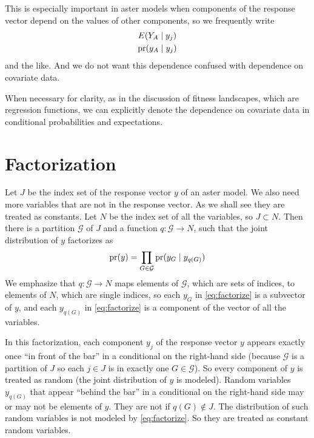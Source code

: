 This is especially important in aster models when components of the response
vector depend on the values of other components, so we frequently write
\begin{gather*}
   E(Y_A \mid y_j)
   \\
   \operatorname{pr}(y_A \mid y_j)
\end{gather*}
and the like.  And we do not want this dependence confused with dependence
on covariate data.

When necessary for clarity, as in the discussion of fitness landscapes,
which are regression functions,
we can explicitly denote the dependence on covariate data in conditional
probabilities and expectations.

\section{Factorization}
\label{sec:factorization}

Let $J$ be the index set of the response vector $y$ of an aster model.
We also need more variables that are not in the response vector.
As we shall see they are treated as constants.
Let $N$ be the index set of all the variables, so $J \subset N$.
Then there is a partition $\mathcal{G}$ of $J$
and a function $q : \mathcal{G} \to N$, such that
the joint distribution of $y$ factorizes as
\begin{equation} \label{eq:factorize}
   \operatorname{pr}(y) = \prod_{G \in \mathcal{G}} \operatorname{pr}(y_G \mid y_{q(G)})
\end{equation}
We emphasize that $q : \mathcal{G} \to N$ maps elements of $\mathcal{G}$,
which are sets of indices, to elements of $N$, which are single indices,
so each $y_G$ in \eqref{eq:factorize} is a subvector of $y$,
and each $y_{q(G)}$ in \eqref{eq:factorize} is a component of the vector
of all the variables.

In this factorization, each component $y_j$ of the response vector $y$
appears exactly once ``in front of the bar'' in a conditional on
the right-hand side (because $\mathcal{G}$ is a partition of $J$ so
each $j \in J$ is in exactly one $G \in \mathcal{G}$).
So every component of $y$ is treated as random (the joint distribution
of $y$ is modeled).
Random variables $y_{q(G)}$ that appear ``behind the bar'' in a conditional
on the right-hand side may or may not be elements of $y$.  They are not
if $q(G) \notin J$.  The distribution of such random variables is not
modeled by \eqref{eq:factorize}.  So they are treated as constant random
variables.

